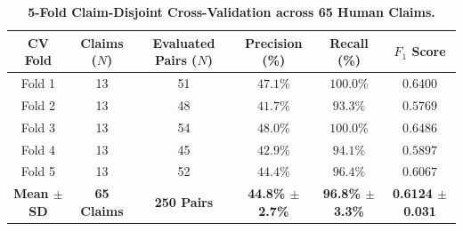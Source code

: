 \documentclass[11pt,a4paper]{article}
\begin{document}
\begin{table}[htbp]
\centering
\small
\caption{\textbf{5-Fold Claim-Disjoint Cross-Validation across 65 Human Claims.}}
\label{tab:5fold_cv}
\begin{adjustbox}{max width=\linewidth}
\begin{tabular}{c c c c c c}
\toprule
\makecell{\textbf{CV}\\\textbf{Fold}} & \makecell{\textbf{Claims}\\\textbf{($N$)}} & \makecell{\textbf{Evaluated}\\\textbf{Pairs ($N$)}} & \makecell{\textbf{Precision}\\\textbf{(\%)}} & \makecell{\textbf{Recall}\\\textbf{(\%)}} & \makecell{\textbf{$F_1$}\\\textbf{Score}} \\
\midrule
Fold 1 & 13 & 51 & $47.1\%$ & $100.0\%$ & $0.6400$ \\
Fold 2 & 13 & 48 & $41.7\%$ & $93.3\%$ & $0.5769$ \\
Fold 3 & 13 & 54 & $48.0\%$ & $100.0\%$ & $0.6486$ \\
Fold 4 & 13 & 45 & $42.9\%$ & $94.1\%$ & $0.5897$ \\
Fold 5 & 13 & 52 & $44.4\%$ & $96.4\%$ & $0.6067$ \\
\midrule
\textbf{Mean $\pm$ SD} & \textbf{65 Claims} & \textbf{250 Pairs} & \textbf{44.8\% $\pm$ 2.7\%} & \textbf{96.8\% $\pm$ 3.3\%} & \textbf{0.6124 $\pm$ 0.031} \\
\bottomrule
\end{tabular}
\end{adjustbox}
\end{table}
\end{document}
